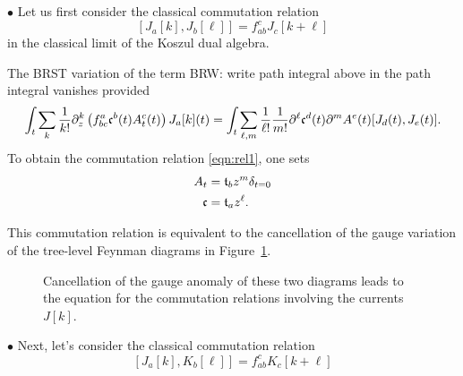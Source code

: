 \documentclass[11pt]{amsart}
\def\brian#1{{\textcolor{blue!65!red}{BRW: {#1}}}}
\begin{document}
$\bullet$
Let us first consider the classical commutation relation 
\begin{equation}\label{eqn:rel1}
[J_a [k] , J_b [\ell]] = f_{ab}^c J_{c} [k+\ell] 
\end{equation}
in the classical limit of the Koszul dual algebra. 

The BRST variation of the term \brian{write path integral above} in the path integral vanishes provided
\[
\int_t \sum_k \frac1{k!} \partial_z^k \left(f_{bc}^a \mathfrak c^b(t) A^c_t (t) \right) J_a[k] (t) = \int_t \sum_{\ell,m} \frac1{\ell!} \frac1{m!} \partial^\ell \mathfrak c^d (t) \partial^m A^e (t) [J_d (t), J_e(t)]  .
\] 
To obtain the commutation relation \eqref{eqn:rel1}, one sets 
\begin{align*}
A_t & = \mathfrak t_b z^{m} \delta_{t=0} \\
\mathfrak c & = \mathfrak t_a z^\ell .
\end{align*}

This commutation relation is equivalent to the cancellation of the gauge variation of the tree-level Feynman diagrams in Figure~\ref{fig:cancel1}.

\begin{figure}
	\caption{Cancellation of the gauge anomaly of these two diagrams leads to the equation for the commutation relations involving the currents $J[k]$.
	\label{fig:cancel1}}
\end{figure}

$\bullet$
Next, let's consider the classical commutation relation 
\begin{equation}\label{eqn:rel2}
[J_a [k] , K_b [\ell]] = f_{ab}^c K_{c} [k+\ell]
\end{equation}
\end{document}
